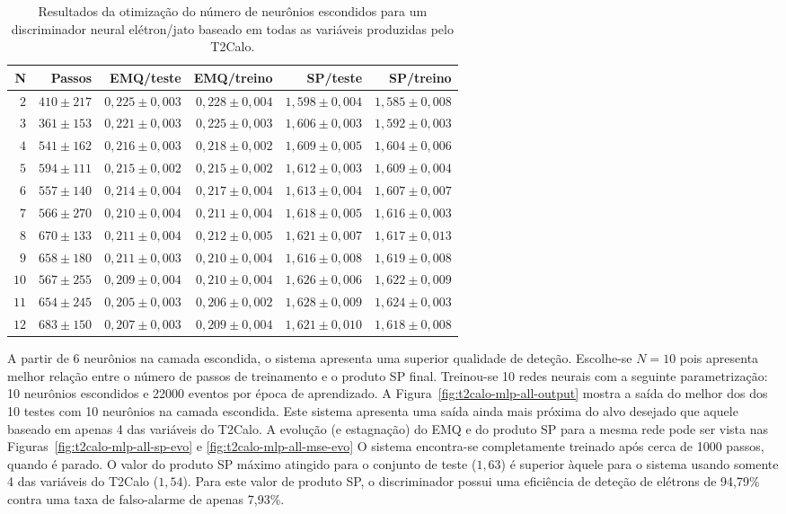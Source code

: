 \begin{table}
\caption{Resultados da otimização do número de neurônios escondidos para um
discriminador neural elétron/jato baseado em todas as variáveis produzidas
pelo T2Calo.}
\label{tab:t2calo-all-hidden-choice}
\begin{center}
\begin{tabular}{|r|r|r|r|r|r|} \hline
N & Passos & EMQ/teste & EMQ/treino & SP/teste & SP/treino \\ \hline 
$2$ & $410\pm217$ & $0,225\pm0,003$ & $0,228\pm0,004$ & $1,598\pm0,004$ & $1,585
\pm0,008$ \\
$3$ & $361\pm153$ & $0,221\pm0,003$ & $0,225\pm0,003$ & $1,606\pm0,003$ & $1,592
\pm0,003$ \\
$4$ & $541\pm162$ & $0,216\pm0,003$ & $0,218\pm0,002$ & $1,609\pm0,005$ & $1,604
\pm0,006$ \\
$5$ & $594\pm111$ & $0,215\pm0,002$ & $0,215\pm0,002$ & $1,612\pm0,003$ & $1,609
\pm0,004$ \\
$6$ & $557\pm140$ & $0,214\pm0,004$ & $0,217\pm0,004$ & $1,613\pm0,004$ & $1,607
\pm0,007$ \\
$7$ & $566\pm270$ & $0,210\pm0,004$ & $0,211\pm0,004$ & $1,618\pm0,005$ & $1,616
\pm0,003$ \\
$8$ & $670\pm133$ & $0,211\pm0,004$ & $0,212\pm0,005$ & $1,621\pm0,007$ & $1,617
\pm0,013$ \\
$9$ & $658\pm180$ & $0,211\pm0,003$ & $0,210\pm0,004$ & $1,616\pm0,008$ & $1,619
\pm0,008$ \\
$10$ & $567\pm255$ & $0,209\pm0,004$ & $0,210\pm0,004$ & $1,626\pm0,006$ & $1,62
2\pm0,009$ \\
$11$ & $654\pm245$ & $0,205\pm0,003$ & $0,206\pm0,002$ & $1,628\pm0,009$ & $1,62
4\pm0,003$ \\
$12$ & $683\pm150$ & $0,207\pm0,003$ & $0,209\pm0,004$ & $1,621\pm0,010$ & $1,61
8\pm0,008$ \\
\hline
\end{tabular}
\end{center}
\end{table}

A partir de 6 neurônios na camada escondida, o sistema apresenta uma superior
qualidade de deteção. Escolhe-se $N=10$ pois apresenta melhor relação entre o
número de passos de treinamento e o produto SP final. Treinou-se 10 redes
neurais com a seguinte parametrização: 10 neurônios escondidos e 22000 eventos
por época de aprendizado. A Figura~\ref{fig:t2calo-mlp-all-output} mostra a
saída do melhor dos dos 10 testes com 10 neurônios na camada escondida. Este
sistema apresenta uma saída ainda mais próxima do alvo desejado que aquele
baseado em apenas 4 das variáveis do T2Calo. A evolução (e estagnação) do EMQ
e do produto SP para a mesma rede pode ser vista nas
Figuras~\ref{fig:t2calo-mlp-all-sp-evo} e \ref{fig:t2calo-mlp-all-mse-evo} O
sistema encontra-se completamente treinado após cerca de 1000 passos, quando é
parado. O valor do produto SP máximo atingido para o conjunto de teste
($1,63$) é superior àquele para o sistema usando somente 4 das variáveis do
T2Calo ($1,54$). Para este valor de produto SP, o discriminador possui uma
eficiência de deteção de elétrons de 94,79\% contra uma taxa de falso-alarme
de apenas 7,93\%.

